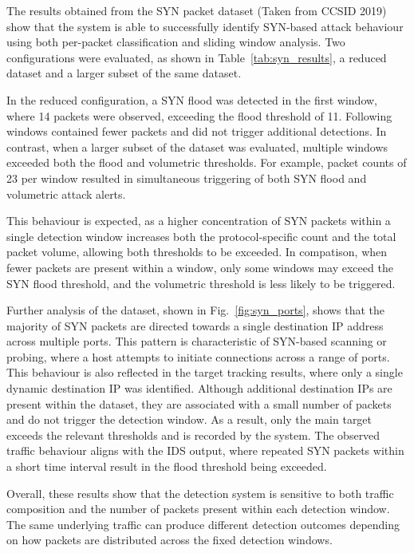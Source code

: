The results obtained from the SYN packet dataset (Taken from CCSID 2019) show that the system is
able to successfully identify SYN-based attack behaviour using both per-packet
classification and sliding window analysis. Two configurations were evaluated,
as shown in Table~\ref{tab:syn_results}, a reduced dataset and a larger
subset of the same dataset.

In the reduced configuration, a SYN flood was detected in the first window,
where 14 packets were observed, exceeding the flood threshold of 11. Following
windows contained fewer packets and did not trigger additional detections. In
contrast, when a larger subset of the dataset was evaluated, multiple windows
exceeded both the flood and volumetric thresholds. For example, packet
counts of 23 per window resulted in simultaneous triggering of both SYN flood
and volumetric attack alerts.

This behaviour is expected, as a higher concentration of SYN packets within a
single detection window increases both the protocol-specific count and the
total packet volume, allowing both thresholds to be exceeded. In compatison, when
fewer packets are present within a window, only some windows may exceed the SYN
flood threshold, and the volumetric threshold is less likely to be triggered.

Further analysis of the dataset, shown in Fig.~\ref{fig:syn_ports}, shows
that the majority of SYN packets are directed towards a single destination IP
address across multiple ports. This pattern is characteristic of SYN-based
scanning or probing, where a host attempts to initiate connections across a
range of ports. This behaviour is also reflected in the target tracking results, where only a
single dynamic destination IP was identified. Although additional destination
IPs are present within the dataset, they are associated with a small
number of packets and do not trigger the detection
window. As a result, only the main target exceeds the relevant thresholds
and is recorded by the system. The observed traffic behaviour aligns with the IDS output, where repeated SYN
packets within a short time interval result in the flood threshold being
exceeded.

Overall, these results show that the detection system is sensitive to
both traffic composition and the number of packets present within each
detection window. The same underlying traffic can produce different detection
outcomes depending on how packets are distributed across the fixed detection
windows.


